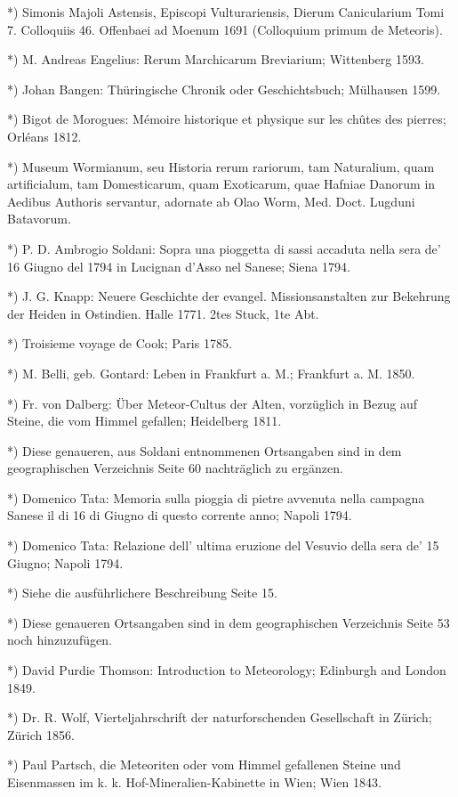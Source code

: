 \documentclass[a4paper, 11pt, oneside, polutonikogreek, german]{article}
\begin{document}
*) Simonis Majoli Astensis, Episcopi Vulturariensis, Dierum Canicularium Tomi 7. Colloquiis 46. Offenbaei ad Moenum 1691 (Colloquium primum de Meteoris).

*) M. Andreas Engelius: Rerum Marchicarum Breviarium; Wittenberg 1593.

*) Johan Bangen: Thüringische Chronik oder Geschichtsbuch; Mülhausen 1599.

*) Bigot de Morogues: Mémoire historique et physique sur les chûtes des pierres; Orléans 1812.

*) Museum Wormianum, seu Historia rerum rariorum, tam Naturalium, quam artificialum, tam Domesticarum, quam Exoticarum, quae Hafniae Danorum in Aedibus Authoris servantur, adornate ab Olao Worm, Med. Doct. Lugduni Batavorum.

*) P. D. Ambrogio Soldani: Sopra una pioggetta di sassi accaduta nella sera de' 16 Giugno del 1794 in Lucignan d'Asso nel Sanese; Siena 1794.

*) J. G. Knapp: Neuere Geschichte der evangel. Missionsanstalten zur Bekehrung der Heiden in Ostindien. Halle 1771. 2tes Stuck, 1te Abt.

*) Troisieme voyage de Cook; Paris 1785.

*) M. Belli, geb. Gontard: Leben in Frankfurt a. M.; Frankfurt a. M. 1850.

*) Fr. von Dalberg: Über Meteor-Cultus der Alten, vorzüglich in Bezug auf Steine, die vom Himmel gefallen; Heidelberg 1811.

*) Diese genaueren, aus Soldani entnommenen Ortsangaben sind in dem geographischen Verzeichnis Seite 60 nachträglich zu ergänzen.

*) Domenico Tata: Memoria sulla pioggia di pietre avvenuta nella campagna Sanese il di 16 di Giugno di questo corrente anno; Napoli 1794.

*) Domenico Tata: Relazione dell' ultima eruzione del Vesuvio della sera de' 15 Giugno; Napoli 1794.

*) Siehe die ausführlichere Beschreibung Seite 15.

*) Diese genaueren Ortsangaben sind in dem geographischen Verzeichnis Seite 53 noch hinzuzufügen.

*) David Purdie Thomson: Introduction to Meteorology; Edinburgh and London 1849.

*) Dr. R. Wolf, Vierteljahrschrift der naturforschenden Gesellschaft in Zürich; Zürich 1856.

*) Paul Partsch, die Meteoriten oder vom Himmel gefallenen Steine und Eisenmassen im k. k. Hof-Mineralien-Kabinette in Wien; Wien 1843.
\end{document}
